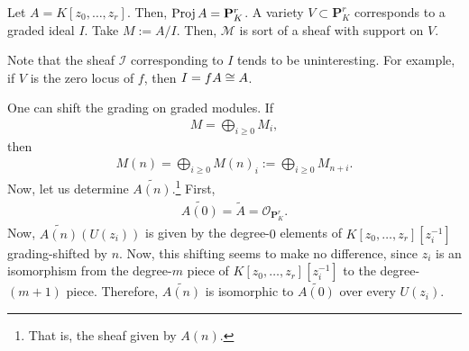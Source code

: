 \documentclass [11 pt, oneside] {article}
\begin{document}
\begin{example}[ ]\label{}\text{}
Let $A = K[z_0,\hdots,z_r]$. Then, $\operatorname{Proj} A = \mathbf{P}^r_K$. A variety $V\subset \mathbf{P}^r_K$ corresponds to a graded ideal $I$. Take $M:=A/I$. Then, $\mathscr{M}$ is sort of a sheaf with support on $V$.

Note that the sheaf $\mathscr{I}$ corresponding to $I$ tends to be uninteresting. For example, if $V$ is the zero locus of $f$, then $I=fA\cong A$.
\end{example}

One can shift the grading on graded modules. If 
\begin{align*}
	M = \bigoplus_{i\ge 0}M_i,
\end{align*}
then
\begin{align*}
	M(n) = \bigoplus_{i\ge 0}M (n)_i :=  \bigoplus_{i\ge 0} M_{n+i}.
\end{align*}
Now, let us determine $\widetilde{A(n)}$.\footnote{That is, the sheaf given by $A(n)$.} First,
\begin{align*}
	\widetilde{A(0) } = \tilde A = \mathscr{O}_{\mathbf{P}^r_K}.
\end{align*}
Now, $\widetilde {A(n)} (U(z_i))$ is given by the degree-$0$ elements of $K[z_0,\hdots,z_r][z_i^{-1}]$ grading-shifted by $n$. Now, this shifting seems to make no difference, since $z_i$ is an isomorphism from the degree-$m$ piece of $K[z_0,\hdots,z_r][z_i^{-1}]$ to the degree-$(m+1) $ piece. Therefore, $\widetilde{A(n)}$ is isomorphic to $\widetilde{A(0)}$ over every $U(z_i)$.
\end{document}
